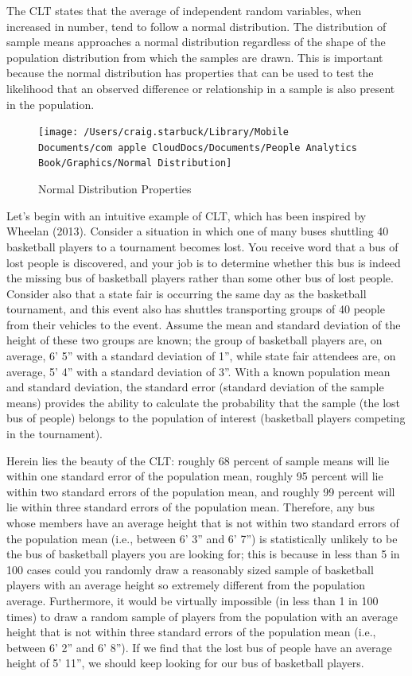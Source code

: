 \documentclass[]{book}
\begin{document}
The CLT states that the average of independent random variables, when increased in number, tend to follow a normal distribution. The distribution of sample means approaches a normal distribution regardless of the shape of the population distribution from which the samples are drawn. This is important because the normal distribution has properties that can be used to test the likelihood that an observed difference or relationship in a sample is also present in the population.

\begin{figure}
\texttt{[image: /Users/craig.starbuck/Library/Mobile Documents/com~apple~CloudDocs/Documents/People Analytics Book/Graphics/Normal Distribution]} \caption{Normal Distribution Properties}\label{fig:unnamed-chunk-4}
\end{figure}

Let's begin with an intuitive example of CLT, which has been inspired by Wheelan (2013). Consider a situation in which one of many buses shuttling 40 basketball players to a tournament becomes lost. You receive word that a bus of lost people is discovered, and your job is to determine whether this bus is indeed the missing bus of basketball players rather than some other bus of lost people. Consider also that a state fair is occurring the same day as the basketball tournament, and this event also has shuttles transporting groups of 40 people from their vehicles to the event. Assume the mean and standard deviation of the height of these two groups are known; the group of basketball players are, on average, 6' 5'' with a standard deviation of 1'', while state fair attendees are, on average, 5' 4'' with a standard deviation of 3''. With a known population mean and standard deviation, the standard error (standard deviation of the sample means) provides the ability to calculate the probability that the sample (the lost bus of people) belongs to the population of interest (basketball players competing in the tournament).

Herein lies the beauty of the CLT: roughly 68 percent of sample means will lie within one standard error of the population mean, roughly 95 percent will lie within two standard errors of the population mean, and roughly 99 percent will lie within three standard errors of the population mean. Therefore, any bus whose members have an average height that is not within two standard errors of the population mean (i.e., between 6' 3'' and 6' 7'') is statistically unlikely to be the bus of basketball players you are looking for; this is because in less than 5 in 100 cases could you randomly draw a reasonably sized sample of basketball players with an average height so extremely different from the population average. Furthermore, it would be virtually impossible (in less than 1 in 100 times) to draw a random sample of players from the population with an average height that is not within three standard errors of the population mean (i.e., between 6' 2'' and 6' 8''). If we find that the lost bus of people have an average height of 5' 11'', we should keep looking for our bus of basketball players.
\end{document}
